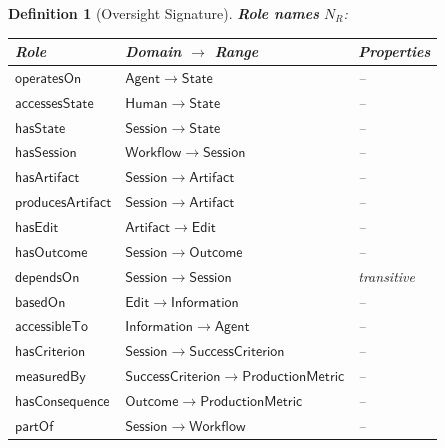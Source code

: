 \documentclass[11pt]{article}
\newtheorem{definition}{Definition}[section]
\begin{document}
\begin{definition}[Oversight Signature]
\medskip\noindent
\textbf{Role names} $N_R$:
\begin{center}
\begin{tabular}{@{}lll@{}}
\toprule
\textbf{Role} & \textbf{Domain $\to$ Range} & \textbf{Properties} \\
\midrule
$\mathsf{operatesOn}$      & $\mathsf{Agent} \to \mathsf{State}$          &  --  \\
$\mathsf{accessesState}$   & $\mathsf{Human} \to \mathsf{State}$          &  --  \\
$\mathsf{hasState}$        & $\mathsf{Session} \to \mathsf{State}$        &  --  \\
$\mathsf{hasSession}$      & $\mathsf{Workflow} \to \mathsf{Session}$     &  --  \\
$\mathsf{hasArtifact}$     & $\mathsf{Session} \to \mathsf{Artifact}$     &  --  \\
$\mathsf{producesArtifact}$& $\mathsf{Session} \to \mathsf{Artifact}$     &  --  \\
$\mathsf{hasEdit}$         & $\mathsf{Artifact} \to \mathsf{Edit}$        &  --  \\
$\mathsf{hasOutcome}$      & $\mathsf{Session} \to \mathsf{Outcome}$      &  --  \\
$\mathsf{dependsOn}$       & $\mathsf{Session} \to \mathsf{Session}$      & transitive \\
$\mathsf{basedOn}$         & $\mathsf{Edit} \to \mathsf{Information}$     &  --  \\
$\mathsf{accessibleTo}$    & $\mathsf{Information} \to \mathsf{Agent}$    &  --  \\
$\mathsf{hasCriterion}$    & $\mathsf{Session} \to \mathsf{SuccessCriterion}$ &  --  \\
$\mathsf{measuredBy}$      & $\mathsf{SuccessCriterion} \to \mathsf{ProductionMetric}$ &  --  \\
$\mathsf{hasConsequence}$  & $\mathsf{Outcome} \to \mathsf{ProductionMetric}$ &  --  \\
$\mathsf{partOf}$          & $\mathsf{Session} \to \mathsf{Workflow}$     &  --  \\
\bottomrule
\end{tabular}
\end{center}


\end{definition}
\end{document}
